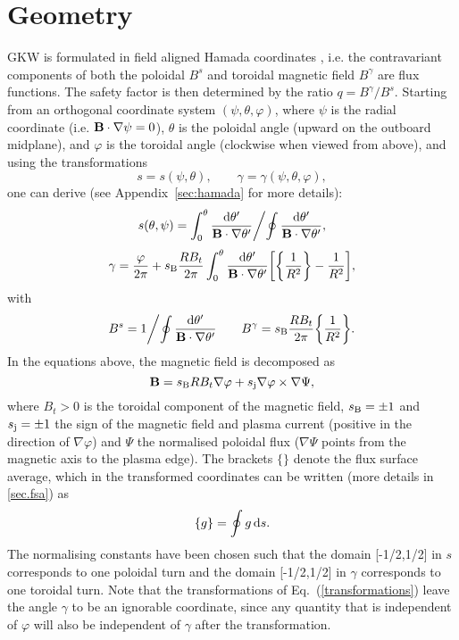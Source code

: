 \section{Geometry}
\label{geometry}
GKW is formulated in field aligned Hamada coordinates \cite{HAM62}, i.e. the contravariant
components of both the poloidal $B^s$ and toroidal magnetic field $B^\gamma$
are flux functions. The safety factor is then determined by the ratio $q = B^\gamma / B^s$.  
Starting from an orthogonal coordinate system $(\psi,\theta,\varphi)$, where $\psi$ is the radial
coordinate (i.e. ${\bf B}\cdot \nabla \psi = 0$), $\theta$ is the poloidal angle (upward 
on the outboard midplane), and $\varphi$ is the toroidal angle (clockwise when viewed from 
above), and using the transformations 
\begin{equation} 
s = s(\psi,\theta), \qquad \gamma = \gamma(\psi,\theta,\varphi),
\label{transformations}
\end{equation} 
one can derive \cite{SCO98,SCO01} (see Appendix~\ref{sec:hamada} for more details):
\begin{equation} 
s(\theta,\psi) = {\int_0^\theta {{\rm d} \theta^\prime \over {\bf B} \cdot \nabla \theta^\prime} 
\biggl /  \oint {{\rm d}\theta^\prime \over {\bf B}\cdot \nabla \theta^\prime}} ,
\end{equation}
\begin{equation} 
\gamma = {\varphi \over 2\pi} + s_{\rm B}{R B_t \over 2\pi} \int_0^\theta {{\rm d} \theta^\prime \over {\bf B}
\cdot \nabla \theta^\prime} \biggl [ \biggl \{ {1\over R^2} \biggr \} - {1\over R^2} 
\biggr ] ,
\end{equation} 
with 
\begin{equation} 
B^s =  {1 \biggl /  \oint {{\rm d}\theta^\prime \over {\bf B}\cdot \nabla \theta^\prime}} \qquad 
B^\gamma = s_{\rm B}{R B_t\over 2 \pi } \biggl \{ {1\over R^2} \biggr \}. 
\end{equation}  
In the equations above, the magnetic field is decomposed as
\begin{equation}
{\bf B} = s_{\rm B}RB_t\nabla \varphi + s_{\rm j}\nabla\varphi\times\nabla\Psi ,
\end{equation}
where $B_t>0$ is the toroidal component of the magnetic field, $s_{\rm B}=\pm 1$ and $s_{\rm j}=\pm 1$ the sign of 
the magnetic field and plasma current (positive in the direction of $\nabla \varphi$) and $\Psi$ the normalised poloidal 
flux ($\nabla \Psi$ points from the magnetic axis to the plasma edge).
The brackets $\{ \}$ denote the flux surface average, which in the transformed coordinates 
can be written (more details in \ref{sec.fsa}) as 
\begin{equation} 
\{ g \} = \oint g \,{\rm d}s. 
\end{equation} 
The normalising constants have been chosen such that the domain [-1/2,1/2] in $s$ corresponds 
to one poloidal turn and the domain [-1/2,1/2] in $\gamma$ corresponds to one toroidal turn.
Note that the transformations of Eq.~(\ref{transformations}) leave the angle $\gamma$ to be 
an ignorable coordinate, since any quantity that is independent of $\varphi$ will also be 
independent of $\gamma$ after the transformation.

